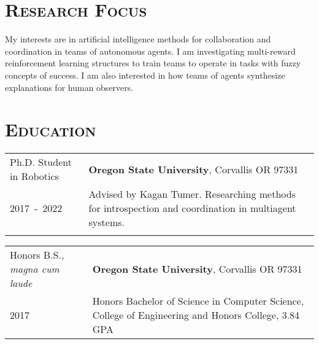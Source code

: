 \documentclass[letterpaper,10pt,titlepage]{article}
\newcommand{\leftW}{0.32\textwidth}
\begin{document}
\pagestyle{empty}%
\par{\par}

\section*{\textsc{Research Focus}}
My interests are in artificial intelligence methods for collaboration and coordination in teams of autonomous agents. I am investigating multi-reward reinforcement learning structures to train teams to operate in tasks with fuzzy concepts of success. 
I am also interested in how teams of agents synthesize explanations for human observers.

\section*{\textsc{Education}}
\begin{tabularx}{\textwidth}{p{\leftW}X}
	Ph.D. Student in Robotics & \textbf{Oregon State University}, Corvallis OR 97331\\

	\mbox{2017 - 2022} & Advised by Kagan Tumer. Researching methods for introspection and coordination in multiagent systems.\\
	 &\\
\end{tabularx}
\begin{tabularx}{\textwidth}{p{\leftW}X}
	Honors B.S., \textit{magna cum laude} & \textbf{Oregon State University}, Corvallis OR 97331\\
	2017 & Honors Bachelor of Science in Computer Science, College of Engineering and Honors College, 3.84 GPA \\
\end{tabularx}
\end{document}
